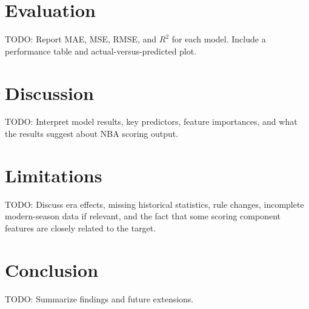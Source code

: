 \documentclass{article}
\begin{document}
\section{Evaluation}

TODO: Report MAE, MSE, RMSE, and $R^2$ for each model. Include a performance table and actual-versus-predicted plot.

\section{Discussion}

TODO: Interpret model results, key predictors, feature importances, and what the results suggest about NBA scoring output.

\section{Limitations}

TODO: Discuss era effects, missing historical statistics, rule changes, incomplete modern-season data if relevant, and the fact that some scoring component features are closely related to the target.

\section{Conclusion}

TODO: Summarize findings and future extensions.



\end{document}
